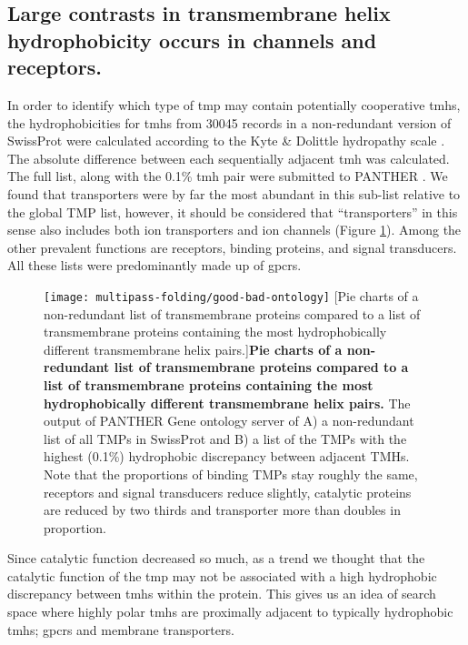 \subsection{Large contrasts in transmembrane helix hydrophobicity occurs in channels and receptors.}
In order to identify which type of \gls{tmp} may contain potentially cooperative \gls{tmh}s, the hydrophobicities for \gls{tmh}s from 30045 records in a non-redundant version of SwissProt were calculated according to the Kyte \& Dolittle hydropathy scale \cite{Kyte1982}.
The absolute difference between each sequentially adjacent \gls{tmh} was calculated.
The full list, along with the 0.1\% \gls{tmh} pair were submitted to PANTHER \cite{Mi2017}.
We found that transporters were by far the most abundant in this sub\--list relative to the global TMP list, however, it should be considered that ``transporters'' in this sense also includes both ion transporters and ion channels (Figure \ref{fig:good-bad-ontology}).
Among the other prevalent functions are receptors, binding proteins, and signal transducers.
All these lists were predominantly made up of \gls{gpcr}s.


\begin{figure}[!ht]
\centering
\texttt{[image: multipass-folding/good-bad-ontology]}
		[Pie charts of a non-redundant list of transmembrane proteins compared to a list of transmembrane proteins containing the most hydrophobically different transmembrane helix pairs.]{\textbf{Pie charts of a non-redundant list of transmembrane proteins compared to a list of transmembrane proteins containing the most hydrophobically different transmembrane helix pairs.}
    The output of PANTHER Gene ontology server of A) a non-redundant list of all TMPs in SwissProt and
    B) a list of the TMPs with the highest (0.1\%) hydrophobic discrepancy between adjacent TMHs.
    Note that the proportions of binding TMPs stay roughly the same, receptors and signal transducers reduce slightly, catalytic proteins are reduced by two thirds and transporter more than doubles in proportion.
    }

\label{fig:good-bad-ontology}
\end{figure}

Since catalytic function decreased so much, as a trend we thought that the catalytic function of the \gls{tmp} may not be associated with a high hydrophobic discrepancy between \gls{tmh}s within the protein.
This gives us an idea of search space where highly polar \gls{tmh}s are proximally adjacent to typically hydrophobic \gls{tmh}s; \gls{gpcr}s and membrane transporters.

